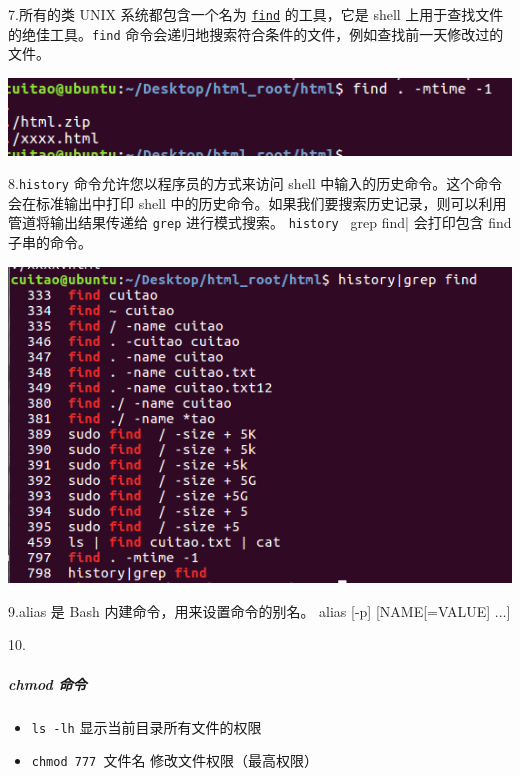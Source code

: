 \documentclass{article}
\begin{document}
7.所有的类 UNIX 系统都包含一个名为 \href{https://man7.org/linux/man-pages/man1/find.1.html}{\verb|find|} 的工具，它是 shell 上用于查找文件的绝佳工具。\verb|find| 命令会递归地搜索符合条件的文件，例如查找前一天修改过的文件。

\noindent
\begin{minipage}{\linewidth}
 \centering
  \includegraphics[width=0.5\linewidth]{Shell7.png}
  \label{fig:example}
\end{minipage}

8.\verb|history| 命令允许您以程序员的方式来访问 shell 中输入的历史命令。这个命令会在标准输出中打印 shell 中的历史命令。如果我们要搜索历史记录，则可以利用管道将输出结果传递给 \verb|grep| 进行模式搜索。 \verb|history | grep find| 会打印包含 find 子串的命令。 

\noindent
\begin{minipage}{\linewidth}
 \centering
  \includegraphics[width=0.5\linewidth]{Shell8.png}
  \label{fig:example}
\end{minipage}

9.alias 是 Bash 内建命令，用来设置命令的别名。 
\newline
alias [-p] [NAME[=VALUE] ...] \newline

10.
\subparagraph{chmod 命令}

\begin{itemize}
    \item \verb|ls -lh| 显示当前目录所有文件的权限
    \item \verb|chmod 777 |文件名 修改文件权限（最高权限）
\end{itemize}
\end{document}
